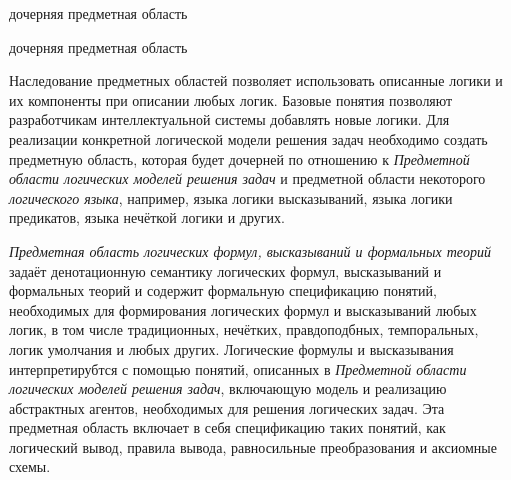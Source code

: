 \begin{SCn}
	\begin{scnrelfromlist}{дочерняя предметная область}
	\end{scnrelfromlist}
	
	\begin{scnindent}
	\end{scnindent}
	
	\begin{scnreltolist}{дочерняя предметная область}
	\end{scnreltolist}
\end{SCn}

Наследование предметных областей позволяет использовать описанные логики и их компоненты при описании любых логик. Базовые понятия позволяют разработчикам интеллектуальной системы добавлять новые логики. Для реализации конкретной логической модели решения задач необходимо создать предметную область, которая будет дочерней по отношению к \textit{Предметной области логических моделей решения задач} и предметной области некоторого \textit{логического языка}, например, языка логики высказываний, языка логики предикатов, языка нечёткой логики и других.

\textit{Предметная область логических формул, высказываний и формальных теорий} задаёт денотационную семантику логических формул, высказываний и формальных теорий и содержит формальную спецификацию понятий, необходимых для формирования логических формул и высказываний любых логик, в том числе традиционных, нечётких, правдоподбных, темпоральных, логик умолчания и любых других. Логические формулы и высказывания интерпретирубтся с помощью понятий, описанных в \textit{Предметной области логических моделей решения задач}, включающую модель и реализацию абстрактных агентов, необходимых для решения логических задач. Эта предметная область включает в себя спецификацию таких понятий, как логический вывод, правила вывода, равносильные преобразования и аксиомные схемы.

